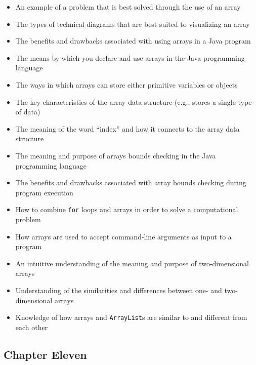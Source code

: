 \documentclass[11pt]{article}
\begin{document}
\begin{itemize}

  \itemsep 0in

  \item An example of a problem that is best solved through the use of an array
  \item The types of technical diagrams that are best suited to visualizing an array
  \item The benefits and drawbacks associated with using arrays in a Java program
  \item The means by which you declare and use arrays in the Java programming language
  \item The ways in which arrays can store either primitive variables or objects
  \item The key characteristics of the array data structure (e.g., stores a single type of data)
  \item The meaning of the word ``index'' and how it connects to the array data structure
  \item The meaning and purpose of arrays bounds checking in the Java programming language
  \item The benefits and drawbacks associated with array bounds
    checking during program execution
  \item How to combine {\tt for} loops and arrays in order to solve a computational problem
  \item How arrays are used to accept command-line arguments as input to a program
  \item An intuitive understanding of the meaning and purpose of two-dimensional arrays
  \item Understanding of the similarities and differences between one- and two-dimensional arrays
  \item Knowledge of how arrays and {\tt ArrayList}s are similar to and different from each other

\end{itemize}

\subsection*{Chapter Eleven}
\end{document}
